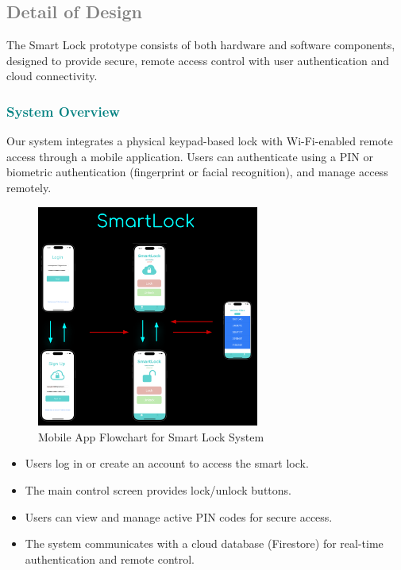 \subsection{\textcolor{gray}{Detail of Design}}
The Smart Lock prototype consists of both hardware and software components, designed to provide secure, remote access control with user authentication and cloud connectivity.

\subsubsection{\textcolor{teal}{System Overview}}

Our system integrates a physical keypad-based lock with Wi-Fi-enabled remote access through a mobile application. Users can authenticate using a PIN or biometric authentication (fingerprint or facial recognition), and manage access remotely.

\begin{figure}[h]
    \centering
    \includegraphics[width=0.65\textwidth]{./img/flowsl.png}
    \caption{Mobile App Flowchart for Smart Lock System}
\end{figure}

\begin{itemize}
    \item Users log in or create an account to access the smart lock.
    \item The main control screen provides lock/unlock buttons.
    \item Users can view and manage active PIN codes for secure access.
    \item The system communicates with a cloud database (Firestore) for real-time authentication and remote control.
\end{itemize}

